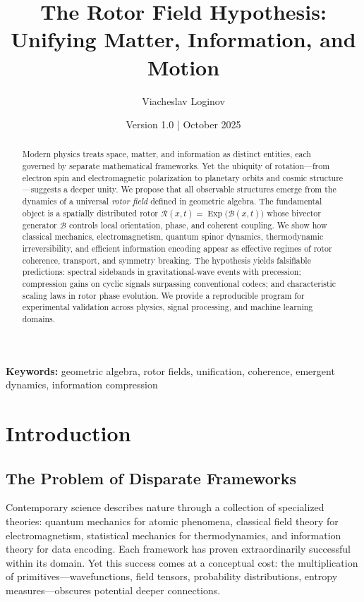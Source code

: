 \documentclass[11pt,a4paper]{article}
\title{\textbf{The Rotor Field Hypothesis: Unifying Matter, Information, and Motion}}
\author[1]{Viacheslav Loginov}
\affil[1]{Kyiv, Ukraine\\ \texttt{barthez.slavik@gmail.com}}
\date{\small Version 1.0 \quad|\quad 10 October 2025}
\newcommand{\Exp}{\operatorname{Exp}}
\newcommand{\Rotor}{\mathcal{R}}
\newcommand{\Biv}{\mathcal{B}}
\theoremstyle{definition}
\theoremstyle{plain}
\theoremstyle{remark}
\begin{document}
\maketitle

\begin{abstract}
\noindent
Modern physics treats space, matter, and information as distinct entities, each governed by separate mathematical frameworks. Yet the ubiquity of rotation---from electron spin and electromagnetic polarization to planetary orbits and cosmic structure---suggests a deeper unity. We propose that all observable structures emerge from the dynamics of a universal \emph{rotor field} defined in geometric algebra. The fundamental object is a spatially distributed rotor $\Rotor(x,t)=\Exp\!\big(\Biv(x,t)\big)$ whose bivector generator $\Biv$ controls local orientation, phase, and coherent coupling. We show how classical mechanics, electromagnetism, quantum spinor dynamics, thermodynamic irreversibility, and efficient information encoding appear as effective regimes of rotor coherence, transport, and symmetry breaking. The hypothesis yields falsifiable predictions: spectral sidebands in gravitational-wave events with precession; compression gains on cyclic signals surpassing conventional codecs; and characteristic scaling laws in rotor phase evolution. We provide a reproducible program for experimental validation across physics, signal processing, and machine learning domains.
\end{abstract}

\noindent\textbf{Keywords:} geometric algebra, rotor fields, unification, coherence, emergent dynamics, information compression

\vspace{1em}

\section{Introduction}

\subsection{The Problem of Disparate Frameworks}

Contemporary science describes nature through a collection of specialized theories: quantum mechanics for atomic phenomena, classical field theory for electromagnetism, statistical mechanics for thermodynamics, and information theory for data encoding. Each framework has proven extraordinarily successful within its domain. Yet this success comes at a conceptual cost: the multiplication of primitives---wavefunctions, field tensors, probability distributions, entropy measures---obscures potential deeper connections.
\end{document}
